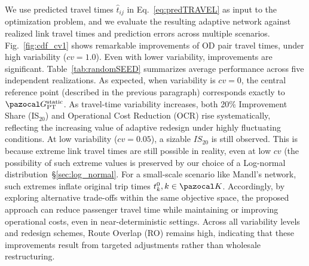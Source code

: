 \documentclass[a4paper,fleqn]{cas-sc}
\begin{document}
We use predicted travel times $\hat{t}_{ij}$ in Eq.~\eqref{eq:predTRAVEL} as input to the optimization problem, and we evaluate the resulting adaptive network against realized link travel times and prediction errors across multiple scenarios.
%
Fig.~\ref{fig:cdf_cv1} shows remarkable improvements of OD pair travel times, under high variability ($cv=1.0$).
Even with lower variability, improvements are significant.
Table~\ref{tab:randomSEED} summarizes average performance across five independent realizations.
As expected, when variability is $\textit{cv}=0$, the central reference point (described in the previous paragraph) corresponds exactly to~$\pazocal G_\text{PT}^\text{static}$. 
As travel-time variability increases, both 20\% Improvement Share (IS$_{20}$) and Operational Cost Reduction (OCR) rise systematically, reflecting the increasing value of adaptive redesign under highly fluctuating conditions.
At low variability ($cv=0.05$), a sizable $IS_{20}$ is still observed. This is because extreme link travel times are still possible in reality, even at low $cv$ (the possibility of such extreme values is preserved by our choice of a Log-normal distribution~\S{}\ref{sec:log_normal}. For a small-scale scenario like Mandl’s network, such extremes inflate original trip times $t_k^0, k\in\pazocal K$.
Accordingly, by exploring alternative trade-offs within the same objective space, the proposed approach can reduce passenger travel time while maintaining or improving operational costs, even in near-deterministic settings.
%
Across all variability levels and redesign schemes, Route Overlap (RO) remains high, indicating that these improvements result from targeted adjustments rather than wholesale restructuring. 
\end{document}
